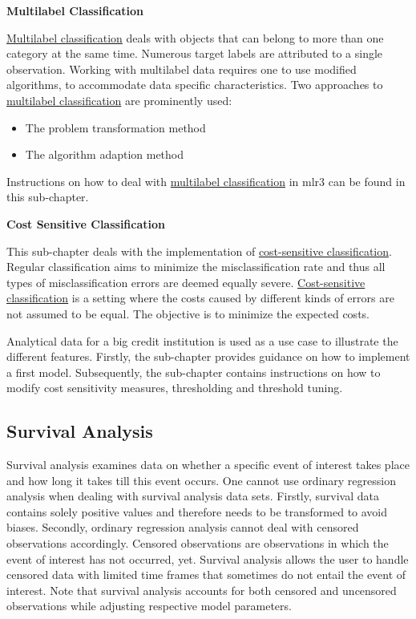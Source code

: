 \documentclass[]{article}
\providecommand{\tightlist}{%
  \setlength{\itemsep}{0pt}\setlength{\parskip}{0pt}}
\begin{document}
\textbf{Multilabel Classification}

\protect\hyperlink{multilabel}{Multilabel classification} deals with objects that can belong to more than one category at the same time.
Numerous target labels are attributed to a single observation.
Working with multilabel data requires one to use modified algorithms, to accommodate data specific characteristics.
Two approaches to \protect\hyperlink{multilabel}{multilabel classification} are prominently used:

\begin{itemize}
\tightlist
\item
  The problem transformation method
\item
  The algorithm adaption method
\end{itemize}

Instructions on how to deal with \protect\hyperlink{multilabel}{multilabel classification} in mlr3 can be found in this sub-chapter.

\textbf{Cost Sensitive Classification}

This sub-chapter deals with the implementation of \protect\hyperlink{cost-sens}{cost-sensitive classification}.
Regular classification aims to minimize the misclassification rate and thus all types of misclassification errors are deemed equally severe.
\protect\hyperlink{cost-sens}{Cost-sensitive classification} is a setting where the costs caused by different kinds of errors are not assumed to be equal.
The objective is to minimize the expected costs.

Analytical data for a big credit institution is used as a use case to illustrate the different features.
Firstly, the sub-chapter provides guidance on how to implement a first model.
Subsequently, the sub-chapter contains instructions on how to modify cost sensitivity measures, thresholding and threshold tuning.

\hypertarget{survival}{%
\subsection{Survival Analysis}\label{survival}}

Survival analysis examines data on whether a specific event of interest takes place and how long it takes till this event occurs.
One cannot use ordinary regression analysis when dealing with survival analysis data sets.
Firstly, survival data contains solely positive values and therefore needs to be transformed to avoid biases.
Secondly, ordinary regression analysis cannot deal with censored observations accordingly.
Censored observations are observations in which the event of interest has not occurred, yet.
Survival analysis allows the user to handle censored data with limited time frames that sometimes do not entail the event of interest.
Note that survival analysis accounts for both censored and uncensored observations while adjusting respective model parameters.
\end{document}

